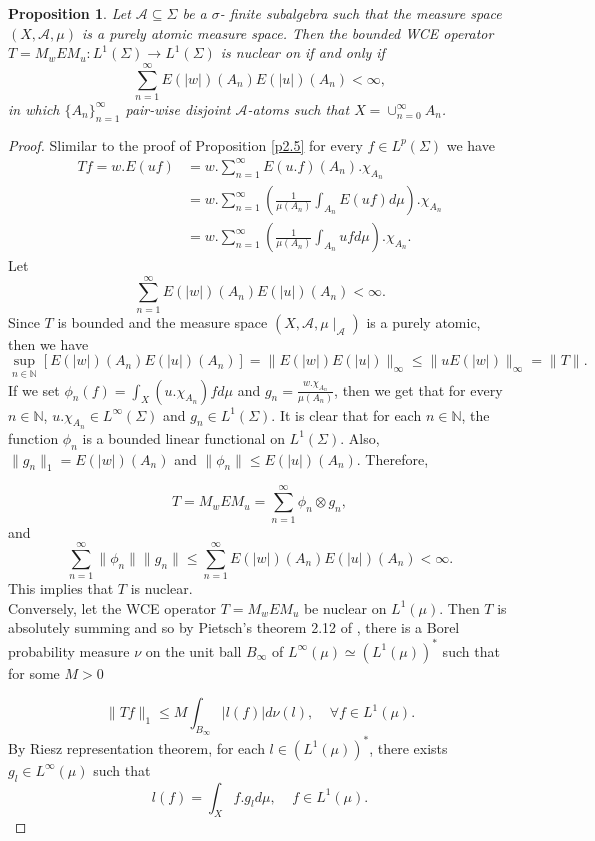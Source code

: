 \documentclass{amsart}
\newtheorem{prop}[thm]{Proposition}
\theoremstyle{definition}\newtheorem{defn}[thm]{Definition}
\theoremstyle{remark}
\numberwithin{equation}{section}
\begin{document}
\begin{prop}\label{p2.7}
Let $\mathcal{A}\subseteq \Sigma$ be a $\sigma$- finite subalgebra such that the measure space $(X, \mathcal{A}, \mu)$ is a purely atomic measure space. Then the bounded WCE operator $T=M_wEM_u:L^1(\Sigma)\rightarrow L^1(\Sigma)$ is nuclear on if and only if
$$\sum^{\infty}_{n=1}E(|w|)(A_n)E(|u|)(A_n)<\infty,$$
in which $\{A_n\}^{\infty}_{n=1}$ pair-wise disjoint $\mathcal{A}$-atoms such that $X=\cup^{\infty}_{n=0}A_n$.
\end{prop}
\begin{proof}
Slimilar to the proof of Proposition \ref{p2.5} for every $f\in L^p(\Sigma)$ we have
\begin{align*}
Tf=w.E(uf)&=w.\sum_{n=1}^{\infty}E(u.f)(A_n).\chi_{A_n}\\
&=w.\sum_{n=1}^{\infty}\left(\frac{1}{\mu(A_n)}\int_{A_n}E(uf)d\mu\right).\chi_{A_n}\\
&=w.\sum_{n=1}^{\infty}\left(\frac{1}{\mu(A_n)}\int_{A_n}ufd\mu\right).\chi_{A_n}.
\end{align*}
Let
$$\sum^{\infty}_{n=1}E(|w|)(A_n)E(|u|)(A_n)<\infty.$$
 Since $T$ is bounded and the measure space $(X, \mathcal{A}, \mu\mid_{\mathcal{A}})$ is a purely atomic, then we have
$$\sup_{n\in \mathbb{N}}\left[E(|w|)(A_n)E(|u|)(A_n)\right]=\|E(|w|)E(|u|)\|_{\infty}\leq\|uE(|w|)\|_{\infty}=\|T\|.$$
If we set $\phi_n(f)=\int_X(u.\chi_{A_n})fd\mu$ and $g_n=\frac{w.\chi_{A_n}}{\mu(A_n)}$, then we get that for every $n\in \mathbb{N}$, $u.\chi_{A_n}\in L^{\infty}(\Sigma)$ and  $g_n\in L^{1}(\Sigma)$. It is clear that for each $n\in \mathbb{N}$, the function $\phi_n$ is a bounded linear functional on $L^1(\Sigma)$. Also, $\|g_n\|_1=E(|w|)(A_n)$ and $\|\phi_n\|\leq E(|u|)(A_n)$. Therefore,

$$T=M_wEM_u=\sum_{n=1}^{\infty}\phi_n\otimes g_n,$$
and
$$\sum_{n=1}^{\infty}\|\phi_n\|\|g_n\|\leq\sum^{\infty}_{n=1}E(|w|)(A_n)E(|u|)(A_n)<\infty.$$
This implies that $T$ is nuclear.\\

Conversely, let the WCE operator $T=M_wEM_u$ be nuclear on $L^1(\mu)$. Then $T$ is absolutely summing and so by Pietsch’s  theorem 2.12 of \cite{die}, there is a Borel probability measure $\nu$ on the unit ball $B_{\infty}$ of $L^{\infty}(\mu)\simeq(L^1(\mu))^*$ such that for some $M>0$

$$\|Tf\|_1\leq M\int_{B_{\infty}}|l(f)|d\nu(l), \ \ \ \ \ \forall f\in L^1(\mu).$$
By Riesz representation theorem, for each $l\in (L^1(\mu))^*$, there exists $g_l\in L^{\infty}(\mu)$ such that
  $$l(f)=\int_Xf.g_l d\mu, \ \ \ \ \ f\in L^1(\mu).$$
  

\end{proof}
\end{document}
